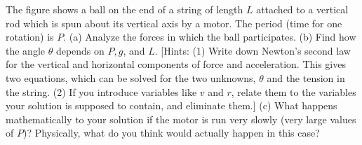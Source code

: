 The figure shows a ball on the end of a string of length
$L$ attached to a vertical rod which is spun about its
vertical axis by a motor. The period (time for one rotation) is $P$.\hwendpart
(a) Analyze the forces in which the ball participates.\hwendpart
(b) Find how the angle $\theta $ depends on $P,g$, and $L$.
[Hints: (1) Write down Newton's second law for the vertical
and horizontal components of force and acceleration. This
gives two equations, which can be solved for the two
unknowns, $\theta $ and the tension in the string. (2) If
you introduce variables like $v$ and $r$, relate them to the
variables your solution is supposed to contain, and eliminate them.]\answercheck\hwendpart
(c) What happens mathematically to your solution if the
motor is run very slowly (very large values of $P$)?
Physically, what do you think would actually happen in this case?
